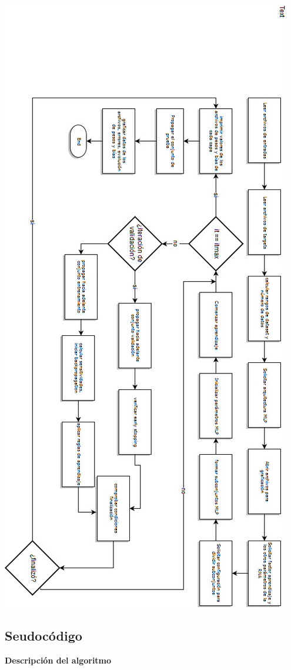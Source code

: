 \documentclass{article}
\begin{document}
\includegraphics[scale=0.5]{2.jpeg}

\subsection{Seudoc\'odigo}
\textbf{Descripción del algoritmo}
\end{document}

